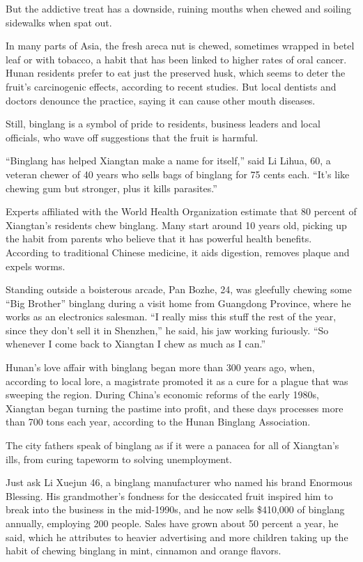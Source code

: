 ﻿\documentclass[12pt]{article}
\begin{document}
But the addictive treat has a downside, ruining mouths when chewed and soiling sidewalks when spat
out.

In many parts of Asia, the fresh areca nut is chewed, sometimes wrapped in betel leaf or with
tobacco, a habit that has been linked to higher rates of oral cancer. Hunan residents prefer to eat
just the preserved husk, which seems to deter the fruit's carcinogenic effects, according to recent
studies. But local dentists and doctors denounce the practice, saying it can cause other mouth
diseases.

Still, binglang is a symbol of pride to residents, business leaders and local officials, who wave
off suggestions that the fruit is harmful.

``Binglang has helped Xiangtan make a name for itself,'' said Li Lihua, 60, a veteran chewer of 40
years who sells bags of binglang for 75 cents each. ``It's like chewing gum but stronger, plus it
kills parasites.''

Experts affiliated with the World Health Organization estimate that 80 percent of Xiangtan's
residents chew binglang. Many start around 10 years old, picking up the habit from parents who
believe that it has powerful health benefits. According to traditional Chinese medicine, it aids
digestion, removes plaque and expels worms.

Standing outside a boisterous arcade, Pan Bozhe, 24, was gleefully chewing some ``Big Brother''
binglang during a visit home from Guangdong Province, where he works as an electronics salesman. ``I
really miss this stuff the rest of the year, since they don't sell it in Shenzhen,'' he said, his
jaw working furiously. ``So whenever I come back to Xiangtan I chew as much as I can.''

Hunan's love affair with binglang began more than 300 years ago, when, according to local lore, a
magistrate promoted it as a cure for a plague that was sweeping the region. During China's economic
reforms of the early 1980s, Xiangtan began turning the pastime into profit, and these days processes
more than 700 tons each year, according to the Hunan Binglang Association.

The city fathers speak of binglang as if it were a panacea for all of Xiangtan's ills, from curing
tapeworm to solving unemployment.

Just ask Li Xuejun 46, a binglang manufacturer who named his brand Enormous Blessing. His
grandmother's fondness for the desiccated fruit inspired him to break into the business in the
mid-1990s, and he now sells \$410,000 of binglang annually, employing 200 people. Sales have grown
about 50 percent a year, he said, which he attributes to heavier advertising and more children
taking up the habit of chewing binglang in mint, cinnamon and orange flavors.
\end{document}
